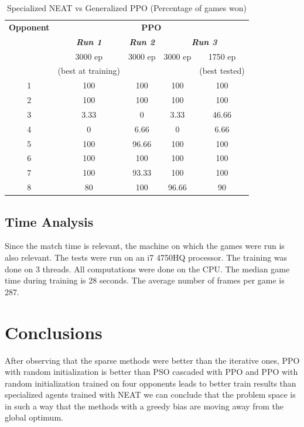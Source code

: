 \documentclass[conference]{IEEEtran}
\begin{document}
    \begin{table}[htbp]
        \caption{Specialized NEAT vs Generalized PPO (Percentage of games won)}
        \begin{center}
            \begin{tabular}{|c|c|c|c|c|}
                \hline
                \textbf{Opponent}&\multicolumn{4}{|c|}{\textbf{PPO}} \\
                \cline{2-5}
                & \textbf{\textit{Run 1}}& \textbf{\textit{Run 2}}& \multicolumn{2}{|c|}{\textbf{\textit{Run 3}}} \\
                \cline{4-5}
                & 3000 ep & 3000 ep & 3000 ep & 1750 ep\\
                & (best at training) & & & (best tested) \\
                \hline
                1 & 100 & 100 & 100 & 100 \\
                2 & 100 & 100 & 100 & 100 \\
                3 & 3.33 & 0 & 3.33 & 46.66 \\
                4 & 0 & 6.66 & 0 & 6.66 \\
                5 & 100 & 96.66 & 100 & 100 \\
                6 & 100 & 100 & 100 & 100 \\
                7 & 100 & 93.33 & 100 & 100 \\
                8 & 80 & 100 & 96.66 & 90 \\
                \hline

            \end{tabular}
        \end{center}
    \end{table}

    \subsection{Time Analysis}\label{subsec:time-analysis}
    Since the match time is relevant, the machine on which the games were run is also relevant.
    The tests were run on an i7 4750HQ processor.
    The training was done on 3 threads.
    All computations were done on the CPU\@.
    The median game time during training is 28 seconds.
    The average number of frames per game is 287.

    \section{Conclusions}\label{sec:conclusions}
    After observing that the sparse methods were better than the iterative ones,
    PPO with random initialization is better than PSO cascaded with PPO and
    PPO with random initialization trained on four opponents leads to better train results
    than specialized agents trained with NEAT we can conclude that the problem space is in such a
    way that the methods with a greedy bias are moving away from the global optimum.
\end{document}
